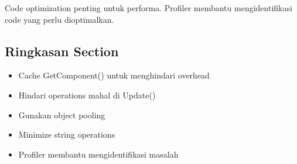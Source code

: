\begin{catatan}
Code optimization penting untuk performa. Profiler membantu mengidentifikasi code yang perlu dioptimalkan.
\end{catatan}

\subsection{Ringkasan Section}

\begin{itemize}
\item Cache GetComponent() untuk menghindari overhead
\item Hindari operations mahal di Update()
\item Gunakan object pooling
\item Minimize string operations
\item Profiler membantu mengidentifikasi masalah
\end{itemize}
